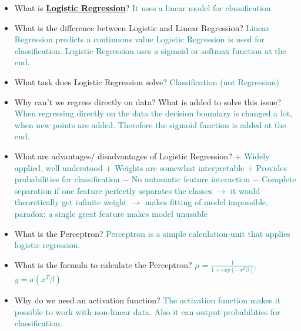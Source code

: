 \documentclass{report}
\newcommand{\asw}[2][teal]{}
\renewcommand{\asw}[2][teal]{\textcolor{#1}{#2}}
\newcommand{\tab}{\hspace*{5mm}}
\begin{document}
\begin{itemize}
	\item What is \textbf{\underline{Logistic Regression}}?
	\asw{\newline It uses a linear model for classification}
	\item What is the difference between Logistic and Linear Regression?
	\asw{\newline Linear Regression predicts a continuous value Logistic Regression is used for classification. Logistic Regression uses a sigmoid or softmax function at the end.}
	\item What task does Logistic Regression solve?
	\asw{\newline Classification (not Regression)}
	\item Why can't we regress directly on data? What is added to solve this issue?
	\asw{\newline When regressing directly on the data the decision boundary is changed a lot, when new points are added. Therefore the sigmoid function is added at the end.}
	\item What are advantages/ disadvantages of Logistic Regression?
	\asw{\newline \textcolor{green}{$+$} Widely applied, well understood
		\newline \textcolor{green}{$+$} Weights are somewhat interpretable
		\newline \textcolor{green}{$+$} Provides probabilities for classification
		\newline \textcolor{red}{$-$} No automatic feature interaction
		\newline \textcolor{red}{$-$} Complete separation if one feature perfectly separates the classes $\rightarrow$ it would theoretically get infinite weight
		\newline \tab $\rightarrow$ makes fitting of model impossible, paradox: a single great feature makes model unusable}
	\item What is the Perceptron?
	\asw{\newline Perceptron is a simple calculation-unit that applies logistic regression.}
	\item What is the formula to calculate the Perceptron?
	\asw{\newline $\mu = \frac{1}{1+ exp(-x^T \beta)}$, $y = a(x^T \beta)$}
	\item Why do we need an activation function?
	\asw{\newline The activation function makes it possible to work with non-linear data. Also it can output probabilities for classification.}

\end{itemize}
\end{document}
